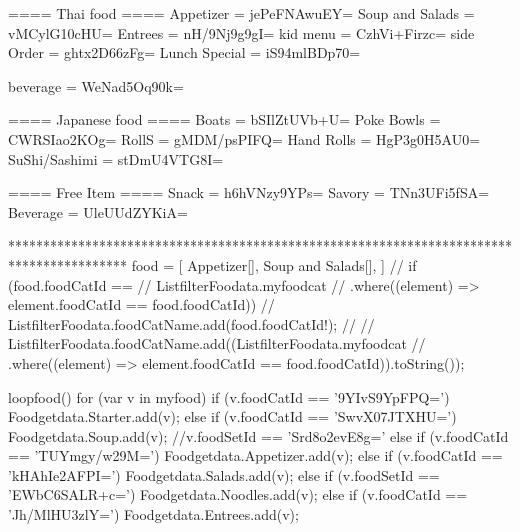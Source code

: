 ==== Thai food ====
Appetizer = jePeFNAwuEY=
Soup and Salads = vMCylG10cHU=
Entrees = nH/9Nj9g9gI=
kid menu = CzhVi+Firzc=
side Order = ghtx2D66zFg=
Lunch Special = iS94mlBDp70=


beverage = WeNad5Oq90k=


==== Japanese food ====
Boats = bSIlZtUVb+U=
Poke Bowls = CWRSIao2KOg=
RollS = gMDM/psPIFQ=
Hand Rolls = HgP3g0H5AU0=
SuShi/Sashimi = stDmU4VTG8I=

==== Free Item ====
Snack = h6hVNzy9YPs=
Savory = TNn3UFi5fSA=
Beverage = UleUUdZYKiA=


*****************************************************************************************
food = [
    Appetizer[],
    Soup and Salads[],
]
// if (food.foodCatId ==
      //     ListfilterFoodata.myfoodcat
      //         .where((element) => element.foodCatId == food.foodCatId)) {
      //   ListfilterFoodata.foodCatName.add(food.foodCatId!);
      // }
      // ListfilterFoodata.foodCatName.add((ListfilterFoodata.myfoodcat
      //     .where((element) => element.foodCatId == food.foodCatId)).toString());

      loopfood() {
    for (var v in myfood) {
      if (v.foodCatId == '9YIvS9YpFPQ=') {
        Foodgetdata.Starter.add(v);
      } else if (v.foodCatId == 'SwvX07JTXHU=') {
        Foodgetdata.Soup.add(v);
        //v.foodSetId == 'Srd8o2evE8g='
      } else if (v.foodCatId == 'TUYmgy/w29M=') {
        Foodgetdata.Appetizer.add(v);
      } else if (v.foodCatId == 'kHAhIe2AFPI=') {
        Foodgetdata.Salads.add(v);
      } else if (v.foodSetId == 'EWbC6SALR+c=') {
        Foodgetdata.Noodles.add(v);
      } else if (v.foodCatId == 'Jh/MlHU3zlY=') {
        Foodgetdata.Entrees.add(v);
      }
    }
  }